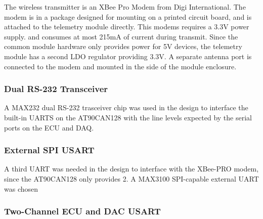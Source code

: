 The wireless transmitter is an XBee Pro Modem from Digi International. The modem is in a package designed for mounting on a printed circuit board, and is attached to the telemetry module directly. This modems requires a 3.3V power supply. and consumes at most 215mA of current during transmit. Since the common module hardware only provides power for 5V devices, the telemetry module has a second LDO regulator providing 3.3V. A separate antenna port is connected to the modem and mounted in the side of the module enclosure.

\subsubsection{Dual RS-232 Transceiver}

A MAX232 dual RS-232 trasceiver chip was used in the design to interface the built-in UARTS on the AT90CAN128 with the line levels expected by the serial ports on the ECU and DAQ.

\subsubsection{External SPI USART}

A third UART was needed in the design to interface with the XBee-PRO modem, since the AT90CAN128 only provides 2. A MAX3100 SPI-capable external UART was chosen


\subsubsection{Two-Channel ECU and DAC USART}
